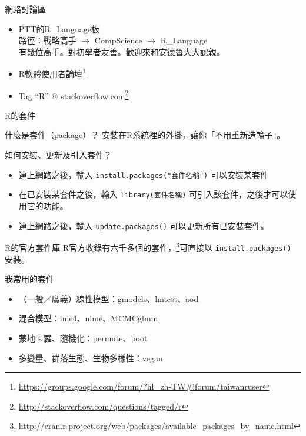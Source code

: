 \documentclass[12pt, aspectratio=43]{beamer}
\let\oldfootnote\footnote
\renewcommand\footnote[1]{\hspace{-0.3em}\oldfootnote{\ignorespaces#1}\hspace{0.3em}}
\begin{document}
\begin{frame}{網路討論區}
\begin{itemize}
\item PTT的R\_Language板 \\ 路徑：戰略高手 $\rightarrow$ CompScience $\rightarrow$ R\_Language\\ 有幾位高手。對初學者友善。歡迎來和安德魯大大認親。
\item R軟體使用者論壇\oldfootnote{\url{https://groups.google.com/forum/?hl=zh-TW\#!forum/taiwanruser}}
\item Tag ``R''  \makeatletter @ \makeatother stackoverflow.com\oldfootnote{\url{http://stackoverflow.com/questions/tagged/r}}
\end{itemize}
\end{frame}



\begin{frame}[fragile]{R的套件}
\begin{block}{什麼是套件（package）？}
安裝在R系統裡的外掛，讓你「不用重新造輪子」。
\end{block}

\begin{block}{如何安裝、更新及引入套件？}
\begin{itemize}
\item 連上網路之後，輸入 \verb+install.packages("套件名稱")+ 可以安裝某套件
\item 在已安裝某套件之後，輸入 \verb+library(套件名稱)+ 可引入該套件，之後才可以使用它的功能。
\item 連上網路之後，輸入 \verb+update.packages()+ 可以更新所有已安裝套件。
\end{itemize}
\end{block}

\end{frame}

\begin{frame}[fragile]{R的官方套件庫}
R官方收錄有六千多個的套件，\footnote{\url{http://cran.r-project.org/web/packages/available_packages_by_name.html}}可直接以 \verb+install.packages()+ 安裝。
\begin{block}{我常用的套件}
\begin{itemize}
\item （一般／廣義）線性模型：gmodels、lmtest、aod
\item 混合模型：lme4、nlme、MCMCglmm
\item 蒙地卡羅、隨機化：permute、boot
\item 多變量、群落生態、生物多樣性：vegan
\end{itemize}
\end{block}
\end{frame}
\end{document}

